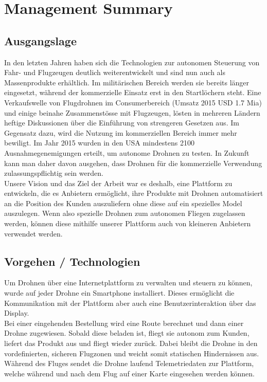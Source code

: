 \newpage
{}
\chapter*{Management Summary}
\section*{Ausgangslage}
In den letzten Jahren haben sich die Technologien zur autonomen Steuerung von Fahr- und Flugzeugen deutlich weiterentwickelt und sind nun auch als Massenprodukte erhältlich. Im militärischen Bereich werden sie bereits länger eingesetzt, während der kommerzielle Einsatz erst in den Startlöchern steht. Eine Verkaufswelle von Flugdrohnen im Consumerbereich (Umsatz 2015 USD 1.7 Mia) \cite{droneNZZ} und einige beinahe Zusammenstösse mit Flugzeugen, lösten in mehreren Ländern heftige Diskussionen über die Einführung von strengeren Gesetzen aus. Im Gegensatz dazu, wird die Nutzung im kommerziellen Bereich immer mehr bewiligt. Im Jahr 2015 wurden in den USA mindestens 2100 \cite{perm} Ausnahmegenemigungen erteilt, um autonome Drohnen zu testen. In Zukunft kann man daher davon ausgehen, dass Drohnen für die kommerzielle Verwendung zulassungspflichtig sein werden.
\\
Unsere Vision und das Ziel der Arbeit war es deshalb, eine Plattform zu entwickeln, die es Anbietern ermöglicht, ihre Produkte mit Drohnen automatisiert an die Position des Kunden auszuliefern ohne diese auf ein spezielles Model auszulegen. Wenn also spezielle Drohnen zum autonomen Fliegen zugelassen werden, können diese mithilfe unserer Plattform auch von kleineren Anbietern verwendet werden.

\section*{Vorgehen / Technologien}
Um Drohnen über eine Internetplattform zu verwalten und steuern zu können, wurde auf jeder Drohne ein Smartphone installiert. Dieses ermöglicht die Kommunikation mit der Plattform aber auch eine Benutzerinteraktion über das Display.
\\
Bei einer eingehenden Bestellung wird eine Route berechnet und dann einer Drohne zugewiesen. Sobald diese beladen ist, fliegt sie autonom zum Kunden, liefert das Produkt aus und fliegt wieder zurück. Dabei bleibt die Drohne in den vordefinierten, sicheren Flugzonen und weicht somit statischen Hindernissen aus. Während des Fluges sendet die Drohne laufend Telemetriedaten zur Plattform, welche während und nach dem Flug auf einer Karte eingesehen werden können.

